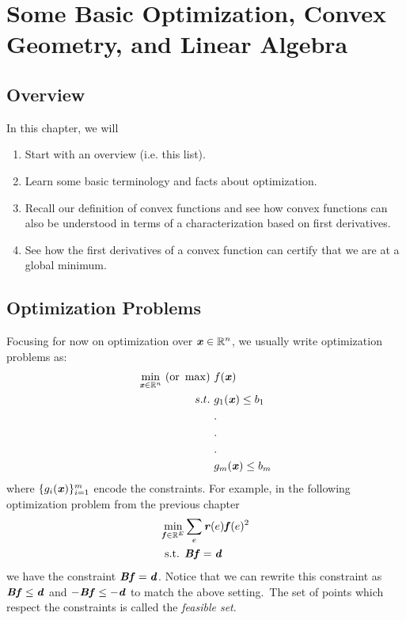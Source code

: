 \chapter{Some Basic Optimization, Convex Geometry, and
  Linear Algebra}
\label{sec:cvopt}


%
\sloppy

\section{Overview}

In this chapter, we will

\begin{enumerate}
\item Start with an overview (i.e. this list).
\item Learn some basic terminology and facts about optimization.
\item Recall our definition of convex functions and see how
  convex functions can also be understood in terms of a
  characterization based on first derivatives.
\item See how the first derivatives of a convex function can certify
  that we are at a global minimum.
\end{enumerate}


\section{Optimization Problems}
Focusing for now on optimization over $\boldsymbol{\mathit{x}} \in \mathbb{R}^n$, we usually write optimization problems as:
\begin{align*}
\min_{\xx \in \R^n} \ ( \textrm{or} \ \max) & \ f(\xx)\\
s.t. & \ g_1(\xx) \leq b_1 \\
	& \ . \\
	& \ . \\
	& \ . \\
	& \ g_m(\xx) \leq b_m  \label{cond1}
%
\end{align*}
%
where $\{g_{i}(\boldsymbol{\mathit{x}})\}_{i=1}^{m}$ encode the constraints. For example, in the following optimization problem from the previous chapter
\begin{align*}
\min_{\boldsymbol{\mathit{f}} \in \mathbb{R}^E} & \sum_e \boldsymbol{\mathit{r}}(e) \boldsymbol{\mathit{f}}(e)^2 \\
\textrm{s.t. } & \boldsymbol{\mathit{B}} \boldsymbol{\mathit{f}} = \boldsymbol{\mathit{d}}
\end{align*}
we have the constraint $\boldsymbol{\mathit{B}} \boldsymbol{\mathit{f}} = \boldsymbol{\mathit{d}}$. Notice that we can rewrite this constraint as $\boldsymbol{\mathit{B}} \boldsymbol{\mathit{f}} \le \boldsymbol{\mathit{d}}$ and $-\boldsymbol{\mathit{B}} \boldsymbol{\mathit{f}} \le -\boldsymbol{\mathit{d}}$ to match the above setting.\ The set of points which respect the constraints is called the \emph{feasible set}.

